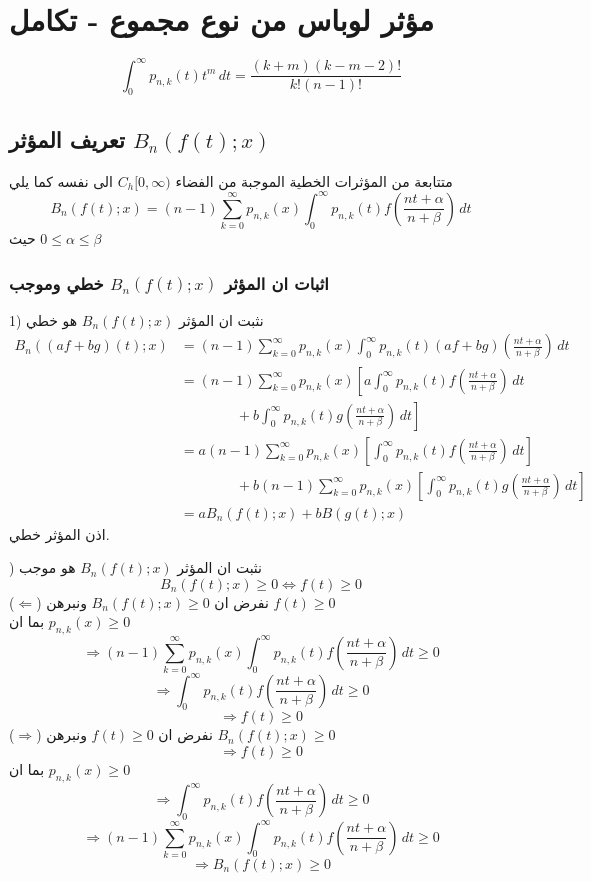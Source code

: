 \chapter{مؤثر لوباس من نوع مجموع - تكامل}
\begin{note}
	\[
	\int_{0}^{\infty} p_{n, k}(t) t^m \, dt = \frac{(k+m)(k-m-2)!}{k!(n-1)!}
	\]
\end{note}
\section{تعريف المؤثر $B_n(f(t); x)$}
متتابعة من المؤثرات الخطية الموجبة من الفضاء $C_h[0, \infty)$ الى نفسه كما يلي
\[
B_n(f(t); x) = (n-1)\sum_{k=0}^{\infty} p_{n, k}(x) \int_{0}^{\infty} p_{n, k}(t) f\left(\frac{nt + \alpha}{n + \beta}\right) \, dt
\]
حيث $0 \leq \alpha\leq \beta$
\subsection*{اثبات ان المؤثر $B_n(f(t); x)$ خطي وموجب}
1) نثبت ان المؤثر $B_n(f(t); x)$ هو خطي
\begin{align*}
	B_n((af+bg)(t); x) &= (n-1)\sum_{k=0}^{\infty} p_{n, k}(x) \int_{0}^{\infty} p_{n, k}(t) (af+bg)\left(\frac{nt + \alpha}{n + \beta}\right) \, dt\\
	&= (n-1)\sum_{k=0}^{\infty} p_{n, k}(x)  \left[a\int_{0}^{\infty} p_{n, k}(t) f\left(\frac{nt + \alpha}{n + \beta}\right) \, dt\right.\\
	&\qquad\qquad  +\left. b\int_{0}^{\infty} p_{n, k}(t) g\left(\frac{nt + \alpha}{n + \beta}\right) \, dt\right]\\
	&= a(n-1)\sum_{k=0}^{\infty} p_{n, k}(x)  \left[\int_{0}^{\infty} p_{n, k}(t) f\left(\frac{nt + \alpha}{n + \beta}\right) \, dt\right]\\
	&\qquad\qquad  + b(n-1)\sum_{k=0}^{\infty} p_{n, k}(x)  \left[\int_{0}^{\infty} p_{n, k}(t) g\left(\frac{nt + \alpha}{n + \beta}\right) \, dt\right]\\
	& = a B_n(f(t) ; x) + b B(g(t); x)
\end{align*}
اذن المؤثر خطي.

) نثبت ان المؤثر $B_n(f(t); x)$ هو موجب
\[
B_n(f(t); x) \geq 0 \iff f(t) \geq 0
\]
($\Leftarrow$) نفرض ان $B_n(f(t); x) \geq 0$ ونبرهن $f(t) \geq 0$\\
بما ان $p_{n, k}(x) \geq 0 $ 
\[
\Rightarrow (n-1)\sum_{k=0}^{\infty} p_{n, k}(x) \int_{0}^{\infty} p_{n, k}(t) f\left(\frac{nt + \alpha}{n + \beta}\right) \, dt \geq 0 
\] 
\[
\Rightarrow \int_{0}^{\infty} p_{n, k}(t) f\left(\frac{nt + \alpha}{n + \beta}\right) \, dt \geq 0
\]
\[
\Rightarrow f(t) \geq 0
\]
($\Rightarrow$) نفرض ان $f(t) \geq 0$ ونبرهن $B_n(f(t); x) \geq 0$
\[
\Rightarrow f(t) \geq 0
\]
بما ان $p_{n, k}(x) \geq 0 $ 
\[
\Rightarrow \int_{0}^{\infty} p_{n, k}(t) f\left(\frac{nt + \alpha}{n + \beta}\right) \, dt \geq 0
\]
\[
\Rightarrow (n-1)\sum_{k=0}^{\infty} p_{n, k}(x) \int_{0}^{\infty} p_{n, k}(t) f\left(\frac{nt + \alpha}{n + \beta}\right) \, dt \geq 0 
\] 
\[
\Rightarrow B_n(f(t); x) \geq 0
\]

